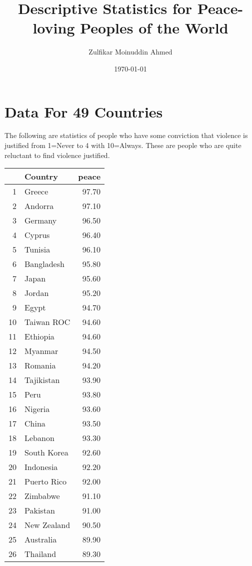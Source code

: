 \documentclass{amsart}
\title{Descriptive Statistics for Peace-loving Peoples of the World}
\author{Zulfikar Moinuddin Ahmed}
\date{\today}
\begin{document}
\maketitle

\section{Data For 49 Countries}

The following are statistics of people who have some conviction that violence is justified from 1=Never to 4 with 10=Always.  These are people who are quite reluctant to find violence justified.

\begin{longtable}{rlr}
  \hline
 & Country & peace \\ 
  \hline
1 & Greece & 97.70 \\ 
  2 & Andorra & 97.10 \\ 
  3 & Germany & 96.50 \\ 
  4 & Cyprus & 96.40 \\ 
  5 & Tunisia & 96.10 \\ 
  6 & Bangladesh & 95.80 \\ 
  7 & Japan & 95.60 \\ 
  8 & Jordan & 95.20 \\ 
  9 & Egypt & 94.70 \\ 
  10 & Taiwan ROC & 94.60 \\ 
  11 & Ethiopia & 94.60 \\ 
  12 & Myanmar & 94.50 \\ 
  13 & Romania & 94.20 \\ 
  14 & Tajikistan & 93.90 \\ 
  15 & Peru & 93.80 \\ 
  16 & Nigeria & 93.60 \\ 
  17 & China & 93.50 \\ 
  18 & Lebanon & 93.30 \\ 
  19 & South Korea & 92.60 \\ 
  20 & Indonesia & 92.20 \\ 
  21 & Puerto Rico & 92.00 \\ 
  22 & Zimbabwe & 91.10 \\ 
  23 & Pakistan & 91.00 \\ 
  24 & New Zealand & 90.50 \\ 
  25 & Australia & 89.90 \\ 
  26 & Thailand & 89.30 \\ 

\end{longtable}
\end{document}
